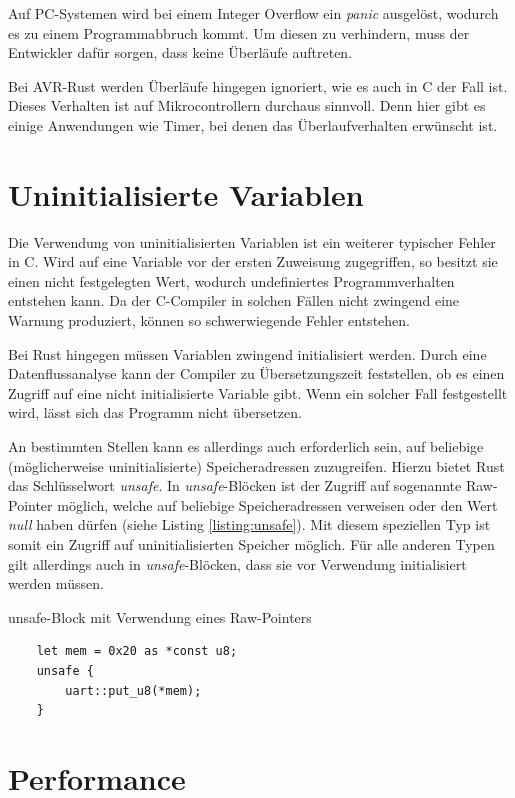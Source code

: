 \documentclass
[ 12pt,
  parskip=half %
]{scrreprt}
\newenvironment{mylisting}[1][H]
{\captionsetup{aboveskip=-0.2\normalbaselineskip}\begin{listing}[#1]}
{\end{listing}}
\begin{document}
Auf PC-Systemen wird bei einem Integer Overflow ein \textit{panic} ausgelöst, wodurch es zu einem Programmabbruch kommt. Um diesen zu verhindern, muss der Entwickler dafür sorgen, dass keine Überläufe auftreten. 

Bei AVR-Rust werden Überläufe hingegen ignoriert, wie es auch in C der Fall ist. Dieses Verhalten ist auf Mikrocontrollern durchaus sinnvoll. Denn hier gibt es einige Anwendungen wie Timer, bei denen das Überlaufverhalten erwünscht ist. 

\section{Uninitialisierte Variablen}

Die Verwendung von uninitialisierten Variablen ist ein weiterer typischer Fehler in C. Wird auf eine Variable vor der ersten Zuweisung zugegriffen, so besitzt sie einen nicht festgelegten Wert, wodurch undefiniertes Programmverhalten entstehen kann. Da der C-Compiler in solchen Fällen nicht zwingend eine Warnung produziert, können so schwerwiegende Fehler entstehen.

Bei Rust hingegen müssen Variablen zwingend initialisiert werden. Durch eine Datenflussanalyse kann der Compiler zu Übersetzungszeit feststellen, ob es einen Zugriff auf eine nicht initialisierte Variable gibt. Wenn ein solcher Fall festgestellt wird, lässt sich das Programm nicht übersetzen.

An bestimmten Stellen kann es allerdings auch erforderlich sein, auf beliebige (möglicherweise uninitialisierte) Speicheradressen zuzugreifen. Hierzu bietet Rust das Schlüsselwort \textit{unsafe}. In \textit{unsafe}-Blöcken ist der Zugriff auf sogenannte Raw-Pointer möglich, welche auf beliebige Speicheradressen verweisen oder den Wert \textit{null} haben dürfen (siehe Listing \ref{listing:unsafe}). Mit diesem speziellen Typ ist somit ein Zugriff auf uninitialisierten Speicher möglich. Für alle anderen Typen gilt allerdings auch in \textit{unsafe}-Blöcken, dass sie vor Verwendung initialisiert werden müssen. 

\begin{mylisting}
	\caption{unsafe-Block mit Verwendung eines Raw-Pointers}
	\label{listing:unsafe}
	\begin{verbatim}
	let mem = 0x20 as *const u8;
	unsafe {
		uart::put_u8(*mem);
	}
	\end{verbatim}
\end{mylisting} 

\section{Performance}
\end{document}

